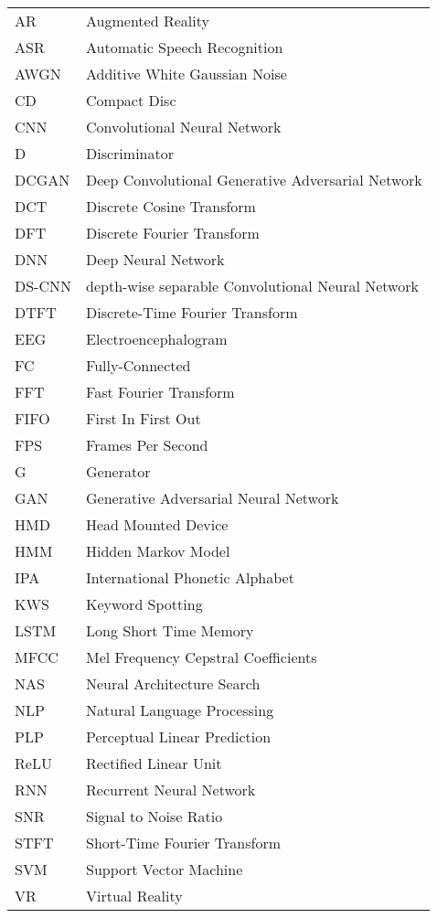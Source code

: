 
\chapter*{}

\begin{tabular}{ l l }
AR & Augmented Reality\\
ASR & Automatic Speech Recognition\\
AWGN & Additive White Gaussian Noise\\
CD & Compact Disc\\
CNN & Convolutional Neural Network\\
D & Discriminator\\
DCGAN & Deep Convolutional Generative Adversarial Network\\
DCT & Discrete Cosine Transform\\
DFT & Discrete Fourier Transform\\
DNN & Deep Neural Network\\
DS-CNN & depth-wise separable Convolutional Neural Network\\
DTFT & Discrete-Time Fourier Transform\\
EEG & Electroencephalogram\\
FC & Fully-Connected\\
FFT & Fast Fourier Transform\\
FIFO & First In First Out\\
FPS & Frames Per Second\\
G & Generator\\
GAN & Generative Adversarial Neural Network\\
HMD & Head Mounted Device\\
HMM & Hidden Markov Model\\
IPA & International Phonetic Alphabet\\
KWS & Keyword Spotting\\
LSTM & Long Short Time Memory\\
MFCC & Mel Frequency Cepstral Coefficients\\
NAS & Neural Architecture Search\\
NLP & Natural Language Processing\\
PLP & Perceptual Linear Prediction\\
ReLU & Rectified Linear Unit\\
RNN & Recurrent Neural Network\\
SNR & Signal to Noise Ratio\\
STFT & Short-Time Fourier Transform\\
SVM & Support Vector Machine\\
VR & Virtual Reality\\
\end{tabular}